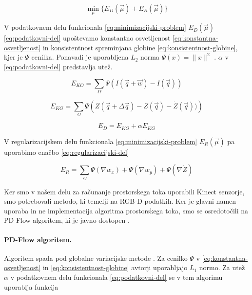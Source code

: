 \begin{equation}\label{eq:minimizacijski-problem}
	\min_{\mu}\{E_D(\vec{\mu}) + E_R(\vec{\mu})\}
\end{equation}

V podatkovnem delu funkcionala \eqref{eq:minimizacijski-problem} $E_D(\vec{\mu})$ \eqref{eq:podatkovni-del} upoštevamo konstantno osvetljenost \eqref{eq:konstantna-osvetljenost} in konsistentnost spreminjana globine \eqref{eq:konsistentnost-globine}, kjer je  $\Psi$ cenilka. Ponavadi je uporabljena $L_2$ norma $\Psi(x) = \| x \|^2$ \cite{yan2016scene}. $\alpha$ v \eqref{eq:podatkovni-del} predstavlja utež.

\begin{equation}\label{eq:konstantna-osvetljenost}
	E_{KO} = \sum_\Omega \Psi( I(\vec{q} + \vec{w}) - I(\vec{q}))
\end{equation}

\begin{equation}\label{eq:konsistentnost-globine}
	E_{KG} = \sum_\Omega \Psi\left( Z(\vec{q} + \Delta \vec{q}) - Z(\vec{q}) - \dot{Z}(\vec{q}))\right)
\end{equation}

\begin{equation}\label{eq:podatkovni-del}
	E_D = E_{KO} + \alpha E_{KG}
\end{equation}

V regularizacijskem delu funkcionala \eqref{eq:minimizacijski-problem} $E_R(\vec{\mu})$ pa uporabimo enačbo \eqref{eq:regularizacijski-del}

\begin{equation}\label{eq:regularizacijski-del}
	E_R = \sum_\Omega \Psi\left( \nabla w_x \right) + \Psi\left( \nabla w_y \right) + \Psi\left( \nabla \dot{Z} \right)
\end{equation}

Ker smo v našem delu za računanje prostorskega toka uporabili Kinect senzorje, smo potrebovali metodo, ki temelji na RGB-D podatkih. Ker je glavni namen uporaba in ne implementacija algoritma prostorskega toka, smo se osredotočili na PD-Flow algoritem, ki je javno dostopen \cite{jaimez2015primal}.

\paragraph{PD-Flow algoritem.}
Algoritem spada pod globalne variacijske metode \cite{jaimez2015primal}. Za cenilko $\Psi$ v \eqref{eq:konstantna-osvetljenost} in \eqref{eq:konsistentnost-globine} avtorji uporabljajo $L_1$ normo. Za utež $\alpha$ v podatkovnem delu funkcionala \eqref{eq:podatkovni-del} se v tem algorimu uporablja funkcija 

